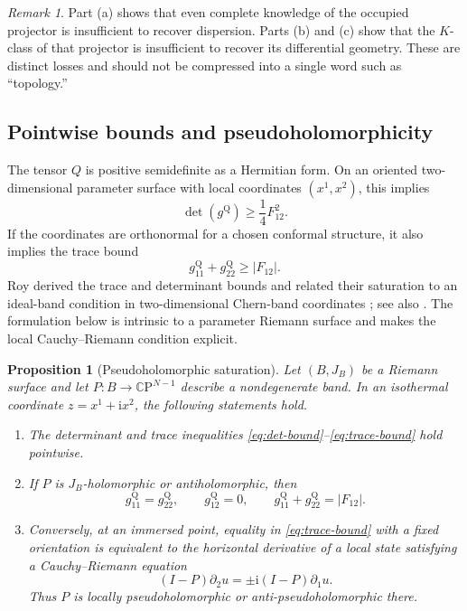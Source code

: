 \documentclass[11pt]{article}
\newtheorem{proposition}[theorem]{Proposition}
\theoremstyle{definition}
\theoremstyle{remark}
\newtheorem{remark}[theorem]{Remark}
\newcommand{\CC}{\mathbb C}
\newcommand{\ii}{\mathrm i}
\begin{document}
\begin{remark}
Part (a) shows that even complete knowledge of the occupied projector is
insufficient to recover dispersion.  Parts (b) and (c) show that the
\(K\)-class of that projector is insufficient to recover its differential
geometry.  These are distinct losses and should not be compressed into a
single word such as ``topology.''
\end{remark}

\subsection{Pointwise bounds and pseudoholomorphicity}

The tensor \(Q\) is positive semidefinite as a Hermitian form.  On an oriented
two-dimensional parameter surface with local coordinates \((x^1,x^2)\), this
implies
\[
       \det(g^{\mathrm Q})
          \geq \frac14F_{12}^2.
          \tag{7.11}\label{eq:det-bound}
\]
If the coordinates are orthonormal for a chosen conformal structure, it also
implies the trace bound
\[
       g_{11}^{\mathrm Q}+g_{22}^{\mathrm Q}
          \geq |F_{12}|.
          \tag{7.12}\label{eq:trace-bound}
\]
Roy derived the trace and determinant bounds and related their saturation to
an ideal-band condition in two-dimensional Chern-band coordinates
\cite{Roy2014}; see also
\cite{MeraOzawaKahler,MeraOzawaFlat,LiuQiangLuXie}.  The formulation below is
intrinsic to a parameter Riemann surface and makes the local
Cauchy--Riemann condition explicit.

\begin{proposition}[Pseudoholomorphic saturation]
\label{prop:pseudoholomorphic-bound}
Let \((B,J_B)\) be a Riemann surface and let
\(P:B\to\CC\mathrm P^{N-1}\) describe a nondegenerate band.  In an isothermal
coordinate \(z=x^1+\ii x^2\), the following statements hold.

\begin{enumerate}[label=\textup{(\alph*)},leftmargin=2.5em]
\item The determinant and trace inequalities
  \eqref{eq:det-bound}--\eqref{eq:trace-bound} hold pointwise.

\item If \(P\) is \(J_B\)-holomorphic or antiholomorphic, then
  \[
       g_{11}^{\mathrm Q}=g_{22}^{\mathrm Q},\qquad
       g_{12}^{\mathrm Q}=0,\qquad
       g_{11}^{\mathrm Q}+g_{22}^{\mathrm Q}=|F_{12}|.
       \tag{7.13}\label{eq:holomorphic-saturation}
  \]

\item Conversely, at an immersed point, equality in
  \eqref{eq:trace-bound} with a fixed orientation is equivalent to the
  horizontal derivative of a local state satisfying a Cauchy--Riemann
  equation
  \[
       (I-P)\partial_2u=\pm\ii(I-P)\partial_1u.
       \tag{7.14}\label{eq:horizontal-CR}
  \]
  Thus \(P\) is locally pseudo\-holomorphic or anti-pseudoholomorphic there.
\end{enumerate}
\end{proposition}
\end{document}
